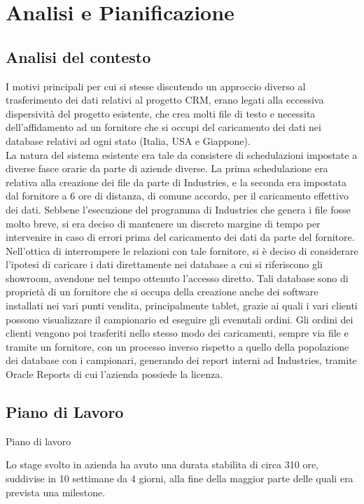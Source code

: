 \section{Analisi e Pianificazione}
\subsection{Analisi del contesto}
I motivi principali per cui si stesse discutendo un approccio diverso al trasferimento dei dati relativi al progetto CRM, erano legati alla eccessiva dispersività del progetto esistente, che crea molti file di testo e necessita dell'affidamento ad un fornitore che si occupi del caricamento dei dati nei database relativi ad ogni stato (Italia, USA e Giappone).\\
La natura del sistema esistente era tale da consistere di schedulazioni impostate a diverse fasce orarie da parte di aziende diverse. La prima schedulazione era relativa alla creazione dei file da parte di Industries, e la seconda era impostata dal fornitore a 6 ore di distanza, di comune accordo, per il caricamento effettivo dei dati. Sebbene l'esecuzione del programma di Industries che genera i file fosse molto breve, si era deciso di mantenere un discreto margine di tempo per intervenire in caso di errori prima del caricamento dei dati da parte del fornitore.\\
Nell'ottica di interrompere le relazioni con tale fornitore, si è deciso di considerare l'ipotesi di caricare i dati direttamente nei database a cui si riferiscono gli showroom, avendone nel tempo ottenuto l'accesso diretto. Tali database sono di proprietà di un fornitore che si occupa della creazione anche dei software installati nei vari punti vendita, principalmente tablet, grazie ai quali i vari clienti possono visualizzare il campionario ed eseguire gli evenutali ordini. Gli ordini dei clienti vengono poi trasferiti nello stesso modo dei caricamenti, sempre via file e tramite un fornitore, con un processo inverso rispetto a quello della popolazione dei database con i campionari, generando dei report interni ad Industries, tramite Oracle Reports di cui l'azienda possiede la licenza.

\subsection{Piano di Lavoro}
 Piano di lavoro

Lo stage svolto in azienda ha avuto una durata stabilita di circa 310 ore, suddivise in 10 settimane da 4 giorni, alla fine della maggior parte delle quali era prevista una milestone.
\newpage
